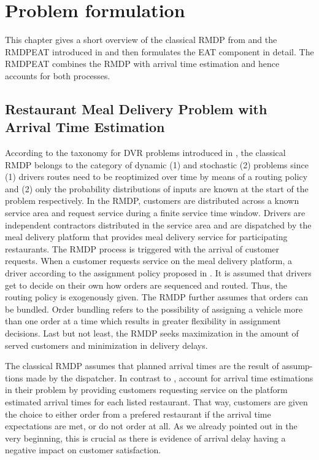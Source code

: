 \chapter{Problem formulation}

This chapter gives a short overview of the classical RMDP from \cite{UlmerRMDP} and the RMDPEAT introduced in \cite{Hildebrandt2020_EAT} and then formulates the EAT component in detail. The RMDPEAT combines the RMDP with arrival time estimation and hence accounts for both processes. 
\section{Restaurant Meal Delivery Problem with Arrival Time Estimation}
According to the taxonomy for DVR problems introduced in \cite{psaraftis}, the classical RMDP belongs to the category of dynamic (1) and stochastic (2) problems since (1) drivers routes need to be reoptimized over time by means of a routing policy and (2) only the probability distributions of inputs are known at the start of the problem respectively. In the RMDP, customers are distributed across a known service area and request service during a finite service time window. Drivers are independent contractors distributed in the service area and are dispatched by the meal delivery platform that provides meal delivery service for participating restaurants. The RMDP process is triggered with the arrival of customer requests. When a customer requests service on the meal delivery platform, a driver according to the assignment policy proposed in \cite{UlmerRMDP}. It is assumed that drivers get to decide on their own how orders are sequenced and routed. Thus, the routing policy is exogenously given. The RMDP further assumes that orders can be bundled. Order bundling refers to the possibility of assigning a vehicle more than one order at a time which results in greater flexibility in assignment decisions. Last but not least, the RMDP seeks maximization in the amount of served customers and minimization in delivery delays.

The classical RMDP assumes that planned arrival times are the result of assump-tions made by the dispatcher. In contrast to \citet{UlmerRMDP}, \citet{Hildebrandt2020_EAT} account for arrival time estimations in their problem by providing customers requesting service on the platform estimated arrival times for each listed restaurant. That way, customers are given the choice to either order from a prefered restaurant if the arrival time expectations are met, or do not order at all. As we already pointed out in the very beginning, this is crucial as there is evidence of arrival delay having a negative impact on customer satisfaction. 


